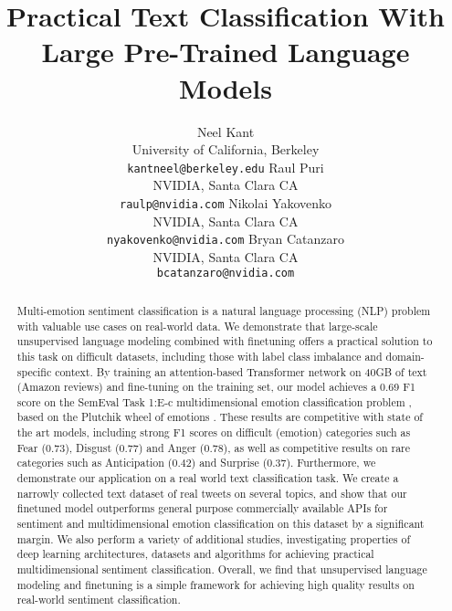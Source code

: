 \documentclass[letterpaper]{article} \usepackage{aaai19}  \usepackage{times}  \usepackage{helvet}  \usepackage{courier}  \usepackage{url}  \usepackage{graphicx}  \usepackage{booktabs}
\begin{document}
\title{Practical Text Classification With Large Pre-Trained Language Models}
\author{
Neel Kant\\
University of California, Berkeley\\
\texttt{kantneel@berkeley.edu}
\And
Raul Puri\\
NVIDIA, Santa Clara CA\\
\texttt{raulp@nvidia.com}
\And
Nikolai Yakovenko\\
NVIDIA, Santa Clara CA\\
\texttt{nyakovenko@nvidia.com}
\And
Bryan Catanzaro\\
NVIDIA, Santa Clara CA\\
\texttt{bcatanzaro@nvidia.com}
}
\maketitle

\begin{abstract}
Multi-emotion sentiment classification is a natural language processing (NLP) problem with valuable use cases on real-world data. We demonstrate that large-scale unsupervised language modeling combined with finetuning offers a practical solution to this task on difficult datasets, including those with label class imbalance and domain-specific context. By training an attention-based Transformer network \protect\cite{Transformer2017} on 40GB of text (Amazon reviews) \protect\cite{McAuley2015} and fine-tuning on the training set, our model achieves a 0.69 F1 score on the SemEval Task 1:E-c multidimensional emotion classification problem \protect\cite{SemEval2018Task1}, based on the Plutchik wheel of emotions \protect\cite{Plutchik1979}. These results are competitive with state of the art models, including strong F1 scores on difficult (emotion) categories such as Fear (0.73), Disgust (0.77) and Anger (0.78), as well as competitive results on rare categories such as Anticipation (0.42) and Surprise (0.37). Furthermore, we demonstrate our application on a 
real world text classification task. We create a narrowly collected text dataset of real tweets on several topics, and show that our finetuned model outperforms general purpose commercially available APIs for sentiment and multidimensional emotion classification on this dataset by a significant margin.
We also perform a variety of additional studies, investigating properties of deep learning architectures, datasets and algorithms for achieving practical multidimensional sentiment classification. Overall, we find that unsupervised language modeling and finetuning is a simple framework for achieving high quality results on real-world sentiment classification. 

\end{abstract}
\end{document}
